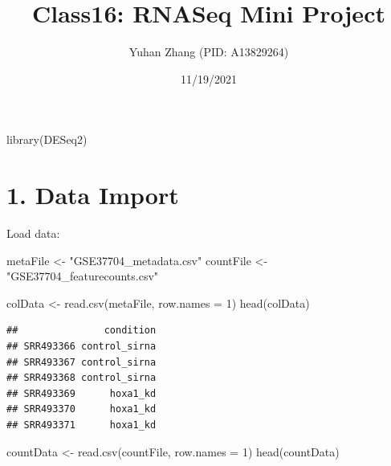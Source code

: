 \documentclass[
]{article}
\title{Class16: RNASeq Mini Project}
\author{Yuhan Zhang (PID: A13829264)}
\date{11/19/2021}
\newenvironment{Shaded}{\begin{snugshade}}{\end{snugshade}}
\newcommand{\AttributeTok}[1]{\textcolor[rgb]{0.77,0.63,0.00}{#1}}
\newcommand{\DecValTok}[1]{\textcolor[rgb]{0.00,0.00,0.81}{#1}}
\newcommand{\FunctionTok}[1]{\textcolor[rgb]{0.00,0.00,0.00}{#1}}
\newcommand{\NormalTok}[1]{#1}
\newcommand{\OtherTok}[1]{\textcolor[rgb]{0.56,0.35,0.01}{#1}}
\newcommand{\StringTok}[1]{\textcolor[rgb]{0.31,0.60,0.02}{#1}}
\begin{document}
\maketitle

\begin{Shaded}
\begin{Highlighting}[]
\FunctionTok{library}\NormalTok{(DESeq2)}
\end{Highlighting}
\end{Shaded}

\hypertarget{data-import}{%
\section{1. Data Import}\label{data-import}}

Load data:

\begin{Shaded}
\begin{Highlighting}[]
\NormalTok{metaFile }\OtherTok{\textless{}{-}} \StringTok{"GSE37704\_metadata.csv"}
\NormalTok{countFile }\OtherTok{\textless{}{-}} \StringTok{"GSE37704\_featurecounts.csv"}
\end{Highlighting}
\end{Shaded}

\begin{Shaded}
\begin{Highlighting}[]
\NormalTok{colData }\OtherTok{\textless{}{-}} \FunctionTok{read.csv}\NormalTok{(metaFile, }\AttributeTok{row.names =} \DecValTok{1}\NormalTok{)}
\FunctionTok{head}\NormalTok{(colData)}
\end{Highlighting}
\end{Shaded}

\begin{verbatim}
##               condition
## SRR493366 control_sirna
## SRR493367 control_sirna
## SRR493368 control_sirna
## SRR493369      hoxa1_kd
## SRR493370      hoxa1_kd
## SRR493371      hoxa1_kd
\end{verbatim}

\begin{Shaded}
\begin{Highlighting}[]
\NormalTok{countData }\OtherTok{\textless{}{-}} \FunctionTok{read.csv}\NormalTok{(countFile, }\AttributeTok{row.names =} \DecValTok{1}\NormalTok{)}
\FunctionTok{head}\NormalTok{(countData)}
\end{Highlighting}
\end{Shaded}
\end{document}
